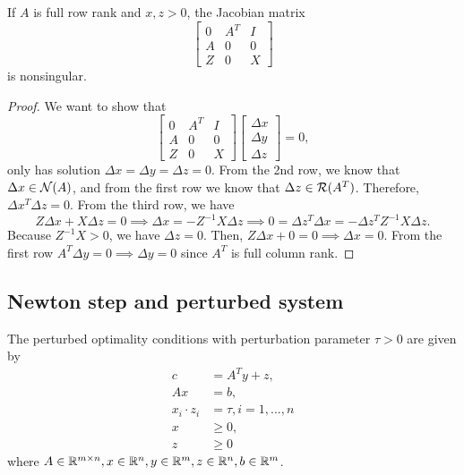 \begin{refsection}
\begin{lemma}
If $A$ is full row rank and $x,z > 0$, the Jacobian matrix 
$$ 
\begin{bmatrix}
0 & A^T & I \\
A & 0 & 0 \\
Z & 0 & X
\end{bmatrix}
$$ is nonsingular.
\end{lemma}
\begin{proof}
We want to show that
$$\begin{bmatrix}
	0 & A^T & I \\
	A & 0 & 0 \\
	Z & 0 & X
\end{bmatrix} \begin{bmatrix}
\Delta x\\
\Delta y\\
\Delta z
\end{bmatrix} = 0,$$
only has solution $\Delta x = \Delta y = \Delta z = 0$.
From the 2nd row, we know that $\Delta x \in \mathcal{N}(A)$, and from the first row we know that $\Delta z \in \mathcal{R}(A^T)$. Therefore, $\Delta x^T \Delta z = 0$. From the third row, we have
$$Z\Delta x + X \Delta z = 0 \implies \Delta x = - Z^{-1}X\Delta z \implies 0 = \Delta z^T \Delta x = - \Delta z^TZ^{-1}X\Delta z. $$
Because $Z^{-1}X > 0$, we have $\Delta z = 0$. Then, $Z\Delta x + 0 = 0 \implies \Delta x = 0$. From the first row $A^T\Delta y = 0 \implies \Delta y = 0$ since $A^T$ is full column rank. 
\end{proof}


\subsection{Newton step and perturbed system}






\begin{definition}
	The perturbed optimality conditions with perturbation parameter $\tau > 0 $ are given by
	\begin{align*}
	c &= A^Ty + z,\\
	Ax &= b,\\
	x_i\cdot z_i &= \tau, i=1,...,n \\
	x &\geq 0,\\ 
	z &\geq 0
	\end{align*}
	where $A\in \mathbb{R}^{m\times n}, x\in \mathbb{R}^n, y\in \mathbb{R}^m, z\in \mathbb{R}^n, b\in \mathbb{R}^m$.
\end{definition}


\end{refsection}
